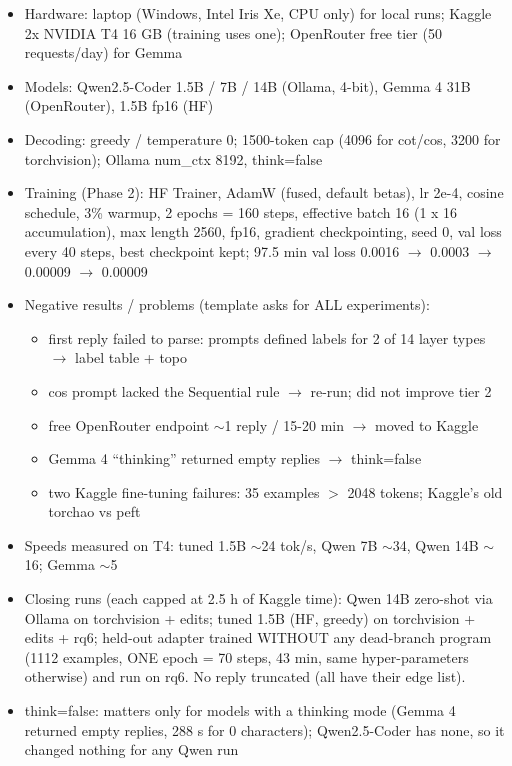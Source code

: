 \documentclass[twoside,english]{article}
\begin{document}
\begin{itemize}
	\item Hardware: laptop (Windows, Intel Iris Xe, CPU only) for local runs; Kaggle 2x NVIDIA T4 16 GB (training uses one); OpenRouter free tier (50 requests/day) for Gemma
	\item Models: Qwen2.5-Coder 1.5B / 7B / 14B (Ollama, 4-bit), Gemma 4 31B (OpenRouter), 1.5B fp16 (HF)
	\item Decoding: greedy / temperature 0; 1500-token cap (4096 for cot/cos, 3200 for torchvision); Ollama num\_ctx 8192, think=false
	\item Training (Phase 2): HF Trainer, AdamW (fused, default betas), lr 2e-4, cosine schedule, 3\% warmup, 2 epochs = 160 steps, effective batch 16 (1 x 16 accumulation), max length 2560, fp16, gradient checkpointing, seed 0, val loss every 40 steps, best checkpoint kept; 97.5 min val loss 0.0016 $\rightarrow$ 0.0003 $\rightarrow$ 0.00009 $\rightarrow$ 0.00009
	\item Negative results / problems (template asks for ALL experiments):
	\begin{itemize}
		\item first reply failed to parse: prompts defined labels for 2 of 14 layer types $\rightarrow$ label table + topo
		\item cos prompt lacked the Sequential rule $\rightarrow$ re-run; did not improve tier 2
		\item free OpenRouter endpoint $\sim$1 reply / 15-20 min $\rightarrow$ moved to Kaggle
		\item Gemma 4 ``thinking'' returned empty replies $\rightarrow$ think=false
		\item two Kaggle fine-tuning failures: 35 examples $>$ 2048 tokens; Kaggle's old torchao vs peft
	\end{itemize}
	\item Speeds measured on T4: tuned 1.5B $\sim$24 tok/s, Qwen 7B $\sim$34, Qwen 14B $\sim$16; Gemma $\sim$5
	\item Closing runs (each capped at 2.5 h of Kaggle time): Qwen 14B zero-shot via Ollama on torchvision + edits; tuned 1.5B (HF, greedy) on torchvision + edits + rq6; held-out adapter trained WITHOUT any dead-branch program (1112 examples, ONE epoch = 70 steps, 43 min, same hyper-parameters otherwise) and run on rq6. No reply truncated (all have their edge list).
	\item think=false: matters only for models with a thinking mode (Gemma 4 returned empty replies, 288 s for 0 characters); Qwen2.5-Coder has none, so it changed nothing for any Qwen run
\end{itemize}
\end{document}

